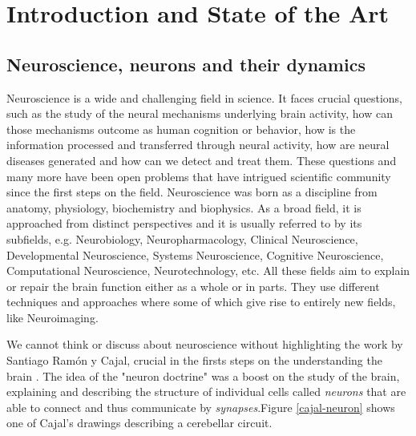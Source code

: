 \chapter{Introduction and State of the Art}
\label{c-intro}

\section{Neuroscience, neurons and their dynamics}
Neuroscience is a wide and challenging field in science. It faces crucial questions, such as the study of the neural mechanisms underlying brain activity, how can those mechanisms outcome as human cognition or behavior, how is the information processed and transferred through neural activity, how are neural diseases generated and how can we detect and treat them. 
These questions and many more have been open problems that have intrigued scientific community since the first steps on the field. Neuroscience was born as a discipline from anatomy, physiology, biochemistry and biophysics. As a broad field, it is approached from distinct perspectives and it is usually referred to by its subfields, e.g. Neurobiology, Neuropharmacology, Clinical Neuroscience, Developmental Neuroscience, Systems Neuroscience, Cognitive Neuroscience, Computational Neuroscience, Neurotechnology, etc. All these fields aim to explain or repair the brain function either as a whole or in parts. They use different techniques and approaches where some of which give rise to entirely new fields, like Neuroimaging.

We cannot think or discuss about neuroscience without highlighting the work by Santiago Ramón y Cajal, crucial in the firsts steps on the understanding the brain  \parencite{RamonyCajal1899,de_carlos_historical_2007,de_castro_editorial_2016,delgado-garcia_cajal_2015,de_castro_cajal_2019}. The idea of the "neuron doctrine" was a boost on the study of the brain, explaining and describing the structure of individual cells called \textit{neurons} that are able to connect and thus communicate by \textit{synapses}.Figure \ref{cajal-neuron} shows one of Cajal's drawings describing a cerebellar circuit.

